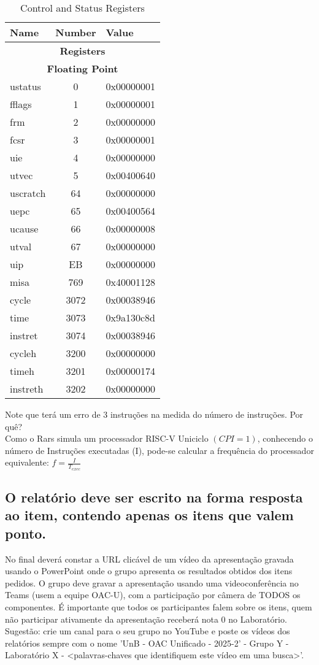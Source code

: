 \documentclass{article}
\begin{document}
\begin{table}[h!]
\centering
\caption{Control and Status Registers}
\begin{tabular}{|l|c|l|}
\hline
\textbf{Name} & \textbf{Number} & \textbf{Value} \\ \hline
\multicolumn{3}{|c|}{\textbf{Registers}} \\ \hline
\multicolumn{3}{|c|}{\textbf{Floating Point}} \\ \hline
ustatus & 0 & 0x00000001 \\ \hline
fflags & 1 & 0x00000001 \\ \hline
frm & 2 & 0x00000000 \\ \hline
fcsr & 3 & 0x00000001 \\ \hline
uie & 4 & 0x00000000 \\ \hline
utvec & 5 & 0x00400640 \\ \hline
uscratch & 64 & 0x00000000 \\ \hline
uepc & 65 & 0x00400564 \\ \hline
ucause & 66 & 0x00000008 \\ \hline
utval & 67 & 0x00000000 \\ \hline
uip & EB & 0x00000000 \\ \hline
misa & 769 & 0x40001128 \\ \hline
cycle & 3072 & 0x00038946 \\ \hline
time & 3073 & 0x9a130c8d \\ \hline
instret & 3074 & 0x00038946 \\ \hline
cycleh & 3200 & 0x00000000 \\ \hline
timeh & 3201 & 0x00000174 \\ \hline
instreth & 3202 & 0x00000000 \\ \hline
\end{tabular}
\end{table}

Note que terá um erro de 3 instruções na medida do número de instruções. Por quê? \\
Como o Rars simula um processador RISC-V Uniciclo $(CPI=1)$, conhecendo o número de Instruções executadas (I), pode-se calcular a frequência do processador equivalente: $f = \frac{I}{T_{exec}}$

\subsection*{O relatório deve ser escrito na forma resposta ao item, contendo apenas os itens que valem ponto.}
No final deverá constar a URL clicável de um vídeo da apresentação gravada usando o PowerPoint onde o grupo apresenta os resultados obtidos dos itens pedidos.
O grupo deve gravar a apresentação usando uma videoconferência no Teams (usem a equipe OAC-U), com a participação por câmera de TODOS os componentes.
É importante que todos os participantes falem sobre os itens, quem não participar ativamente da apresentação receberá nota 0 no Laboratório. \\
Sugestão: crie um canal para o seu grupo no YouTube e poste os vídeos dos relatórios sempre com o nome 'UnB - OAC Unificado - 2025-2' - Grupo Y - Laboratório X - <palavras-chaves que identifiquem este vídeo em uma busca>'.
\end{document}
